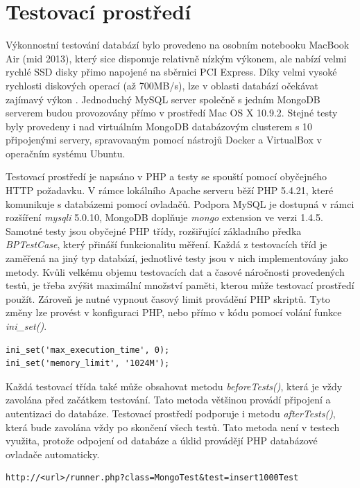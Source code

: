 \section{Testovací prostředí}
Výkonnostní testování databází bylo provedeno na osobním notebooku MacBook Air (mid 2013), který sice disponuje relativně nízkým výkonem, ale nabízí velmi rychlé SSD disky přimo napojené na sběrnici PCI Express. Díky velmi vysoké rychlosti diskových operací (až 700MB/s), lze v oblasti databází očekávat zajímavý výkon \cite{macDiskSpeed}. Jednoduchý MySQL server společně s jedním MongoDB serverem budou provozovány přímo v prostředí Mac OS X 10.9.2. Stejné testy byly provedeny i nad virtuálním MongoDB databázovým clusterem s 10 připojenými servery, spravovaným pomocí nástrojů Docker a VirtualBox v operačním systému Ubuntu.

Testovací prostředí je napsáno v PHP a testy se spouští pomocí obyčejného HTTP požadavku. V rámce lokálního Apache serveru běží PHP 5.4.21, které komunikuje s databázemi pomocí ovladačů. Podpora MySQL je dostupná v rámci rozšíření \emph{mysqli} 5.0.10, MongoDB  doplňuje \emph{mongo} extension ve verzi 1.4.5. Samotné testy jsou obyčejné PHP třídy, rozšiřující základního předka \emph{BPTestCase}, který přináší funkcionalitu měření. Každá z testovacích tříd je zaměřená na jiný typ databází, jednotlivé testy jsou v nich implementovány jako metody. Kvůli velkému objemu testovacích dat a časové náročnosti provedených testů, je třeba zvýšit maximální množství paměti, kterou může testovací prostředí použít. Zároveň je nutné vypnout časový limit provádění PHP skriptů. Tyto změny lze provést v konfiguraci PHP, nebo přímo v kódu pomocí volání funkce \emph{ini\_set()}.

\begin{lstlisting}[caption={Nutná konfigurace PHP prostředí}]
ini_set('max_execution_time', 0);
ini_set('memory_limit', '1024M');
\end{lstlisting}

Každá testovací třída také může obsahovat metodu \emph{beforeTests()}, která je vždy zavolána před začátkem testování. Tato metoda většinou provádí připojení a autentizaci do databáze. Testovací prostředí podporuje i metodu \emph{afterTests()}, která bude zavolána vždy po skončení všech testů. Tato metoda není v testech využita, protože odpojení od databáze a úklid provádějí PHP databázové ovladače automaticky. 

\begin{lstlisting}[caption={Ukázka HTTP požadavku který spustí test "insert1000Test" na třídě MongoTest}]
http://<url>/runner.php?class=MongoTest&test=insert1000Test
\end{lstlisting}

